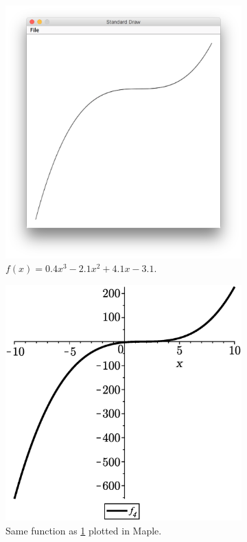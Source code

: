 \begin{figure}[H]
    \begin{subfigure}{0.5\textwidth}
        \centering 
        \includegraphics[width=0.7\linewidth]{GraphicalFunctionPlotter/fig/f4} 
        \caption{$f(x)=0.4x^3-2.1x^2+4.1x-3.1$.}
        \label{fig:f4}
    \end{subfigure}
    \begin{subfigure}{0.5\textwidth}
        \centering
        \includegraphics[width=0.7\linewidth]{GraphicalFunctionPlotter/fig/f4Check}
        \caption{Same function as \ref{fig:f4} plotted in Maple.}
        \label{fig:f4Check}
    \end{subfigure}
    \begin{subfigure}{0.5\textwidth}
        \centering

\end{subfigure}
\end{figure}
